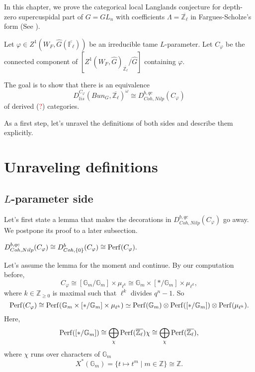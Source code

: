 In this chapter, we prove the categorical local Langlands conjecture for depth-zero supercuspidal part of $G=GL_n$ with coefficients $\Lambda=\overline{\mathbb{Z}_{\ell}}$ in Fargues-Scholze's form (See \cite[Conjecture X.3.5]{fargues2021geometrization}).

Let $\varphi \in Z^1(W_F, \hat{G}(\overline{\mathbb{F}_{\ell}}))$ be an irreducible tame $L$-parameter. Let $C_{\varphi}$ be the connected component of $[Z^1(W_F, \hat{G})_{\overline{\mathbb{Z}_{\ell}}}/\hat{G}]$ containing $\varphi$. 

The goal is to show that there is an equivalence
$$D_{lis}^{C_{\varphi}}(Bun_G, \overline{\mathbb{Z}_{\ell}})^{\omega} \cong D^{b, qc}_{Coh, Nilp}(C_{\varphi})$$
of derived (\textcolor{red}{?}) categories.

As a first step, let's unravel the definitions of both sides and describe them explicitly.

\section{Unraveling definitions}

\subsection{$L$-parameter side}

Let's first state a lemma that makes the decorations in $D^{b, qc}_{Coh, Nilp}(C_{\varphi})$ go away. We postpone its proof to a later subsection.

\begin{lemma} \label{Lemma 1}
	$D^{b, qc}_{Coh, Nilp}(C_{\varphi}) \cong D^b_{Coh, \{0\}}(C_{\varphi}) \cong \operatorname{\operatorname{Perf}}(C_{\varphi}).$
\end{lemma} 
	
Let's assume the lemma for the moment and continue. By our computation before,
$$C_{\varphi} \cong [\mathbb{G}_m/\mathbb{G}_m] \times \mu_{\ell^k} \cong \mathbb{G}_m \times [*/\mathbb{G}_m] \times \mu_{\ell^k},$$
where $k \in \mathbb{Z}_{\geq 0}$ is maximal such that $\ell^k$ divides $q^n-1$. So
$$\operatorname{\operatorname{Perf}}(C_{\varphi}) \cong \operatorname{\operatorname{Perf}}(\mathbb{G}_m \times [*/\mathbb{G}_m] \times \mu_{\ell^k}) \simeq \operatorname{\operatorname{Perf}}(\mathbb{G}_m) \otimes \operatorname{\operatorname{Perf}}([*/\mathbb{G}_m]) \otimes \operatorname{\operatorname{Perf}}(\mu_{\ell^k}).$$
Here,
$$\operatorname{\operatorname{Perf}}([*/\mathbb{G}_m]) \cong \bigoplus_{\chi}\operatorname{\operatorname{Perf}}(\overline{\mathbb{Z}_{\ell}})\chi \cong \bigoplus_{\chi}\operatorname{\operatorname{Perf}}(\overline{\mathbb{Z}_{\ell}}),$$
where $\chi$ runs over characters of $\mathbb{G}_m$ 
$$X^*(\mathbb{G}_m)=\{t \mapsto t^m \;|\; m \in \mathbb{Z}\} \cong \mathbb{Z}.$$

